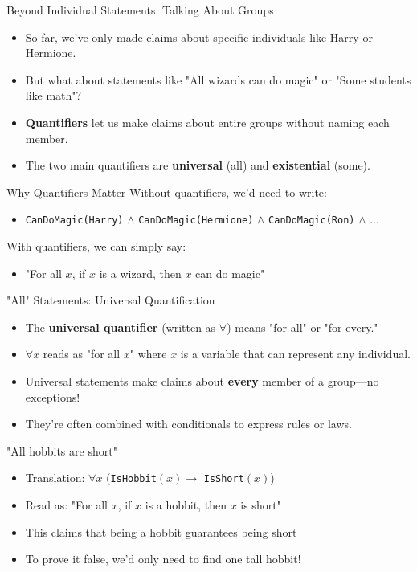 \documentclass{beamer}
\begin{document}
	\begin{frame}{Beyond Individual Statements: Talking About Groups}
		\begin{itemize}
			\item So far, we've only made claims about specific individuals like Harry or Hermione.
			\item But what about statements like "All wizards can do magic" or "Some students like math"?
			\item \textbf{Quantifiers} let us make claims about entire groups without naming each member.
			\item The two main quantifiers are \textbf{universal} (all) and \textbf{existential} (some).
		\end{itemize}
		
		\begin{block}{Why Quantifiers Matter}
			Without quantifiers, we'd need to write:
			\begin{itemize}
				\item \texttt{CanDoMagic(Harry)} $\land$ \texttt{CanDoMagic(Hermione)} $\land$ \texttt{CanDoMagic(Ron)} $\land$ ...
			\end{itemize}
			With quantifiers, we can simply say:
			\begin{itemize}
				\item "For all $x$, if $x$ is a wizard, then $x$ can do magic"
			\end{itemize}
		\end{block}
	\end{frame}
	
	\begin{frame}{"All" Statements: Universal Quantification}
		\begin{itemize}
			\item The \textbf{universal quantifier} (written as $\forall$) means "for all" or "for every."
			\item $\forall x$ reads as "for all $x$" where $x$ is a variable that can represent any individual.
			\item Universal statements make claims about \textbf{every} member of a group—no exceptions!
			\item They're often combined with conditionals to express rules or laws.
		\end{itemize}
		
		\begin{example}
			"All hobbits are short"
			\begin{itemize}
				\item Translation: $\forall x$ (\texttt{IsHobbit}$(x) \rightarrow$ \texttt{IsShort}$(x)$)
				\item Read as: "For all $x$, if $x$ is a hobbit, then $x$ is short"
				\item This claims that being a hobbit guarantees being short
				\item To prove it false, we'd only need to find one tall hobbit!
			\end{itemize}
		\end{example}
	\end{frame}
	
\end{document}

